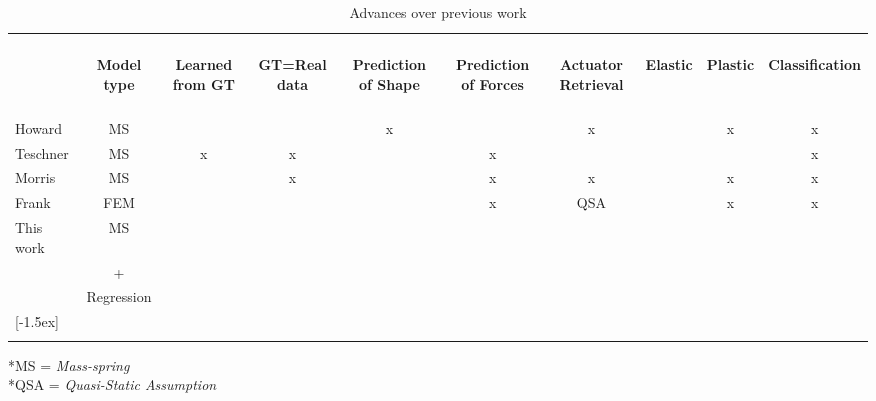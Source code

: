 \documentclass[journal]{IEEEtran}
\def\gtick{\checkmark}
\def\rcross{x}
\begin{document}
\begin{table}[t]
  \caption{Advances over previous work}\label{t:advances}
  \begin{tabular}{lccccccccc}
  \hline \\ [-1.5ex]
 & \begin{sideways}\textbf{Model type}\end{sideways} & \begin{sideways}\textbf{Learned from GT}\end{sideways} & \begin{sideways}\textbf{GT=Real data}\end{sideways} & \begin{sideways}\textbf{Prediction of Shape} \end{sideways} & \begin{sideways}\textbf{Prediction of Forces}\end{sideways} & \begin{sideways}\textbf{Actuator Retrieval} \end{sideways} & \begin{sideways}\textbf{Elastic}\end{sideways} & \begin{sideways}\textbf{Plastic}\end{sideways} & \begin{sideways}\textbf{Classification}\end{sideways} \\
 \hline\hline \\ [-1.5ex]
  Howard & MS & \gtick  & \gtick  & \rcross & \gtick & \rcross & \gtick & \rcross & \rcross\\
Teschner & MS & \rcross & \rcross & \gtick & \rcross & \gtick & \gtick & \gtick & \rcross \\
  Morris & MS & \gtick  & \rcross & \gtick & \rcross & \rcross & \gtick & \rcross & \rcross \\
  Frank & FEM & \gtick  & \gtick & \gtick & \rcross & QSA & \gtick & \rcross & \rcross \\
  This work & MS & \gtick  & \gtick & \gtick & \gtick & \gtick & \gtick & \gtick & \gtick \\
         & + &&&&&&&&\\
         & Regression &&&&&&&& \\
 [-1.5ex] \\ \hline \\ [-1.5ex]
 \end{tabular}
 *MS = \textit{Mass-spring}\\
 *QSA = \textit{Quasi-Static Assumption}
\end{table}
\end{document}
